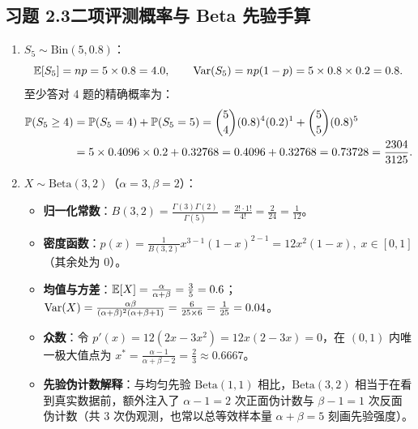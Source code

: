 \subsection*{习题 2.3\quad 二项评测概率与 Beta 先验手算}
\begin{enumerate}[label=(\arabic*), leftmargin=1.8em]
  \item $S_5 \sim \mathrm{Bin}(5, 0.8)$：
  \[
    \mathbb{E}[S_5] = np = 5 \times 0.8 = 4.0, \qquad
    \operatorname{Var}(S_5) = np(1-p) = 5 \times 0.8 \times 0.2 = 0.8.
  \]
  至少答对 4 题的精确概率为：
  \begin{align*}
    \mathbb{P}(S_5 \ge 4) &= \mathbb{P}(S_5 = 4) + \mathbb{P}(S_5 = 5)
    = \binom{5}{4}(0.8)^4(0.2)^1 + \binom{5}{5}(0.8)^5 \\
    &= 5 \times 0.4096 \times 0.2 + 0.32768 = 0.4096 + 0.32768 = 0.73728 = \frac{2304}{3125}.
  \end{align*}
  \item $X \sim \mathrm{Beta}(3, 2)$（$\alpha = 3, \beta = 2$）：
  \begin{itemize}
    \item \textbf{归一化常数}：$B(3, 2) = \frac{\Gamma(3)\Gamma(2)}{\Gamma(5)} = \frac{2!\cdot 1!}{4!} = \frac{2}{24} = \frac{1}{12}$。
    \item \textbf{密度函数}：$p(x) = \frac{1}{B(3,2)} x^{3-1}(1-x)^{2-1} = 12x^2(1 - x),\; x \in [0, 1]$（其余处为 $0$）。
    \item \textbf{均值与方差}：$\mathbb{E}[X] = \frac{\alpha}{\alpha+\beta} = \frac{3}{5} = 0.6$；$\operatorname{Var}(X) = \frac{\alpha\beta}{(\alpha+\beta)^2(\alpha+\beta+1)} = \frac{6}{25\times 6} = \frac{1}{25} = 0.04$。
    \item \textbf{众数}：令 $p'(x) = 12(2x - 3x^2) = 12x(2 - 3x) = 0$，在 $(0,1)$ 内唯一极大值点为 $x^* = \frac{\alpha-1}{\alpha+\beta-2} = \frac{2}{3} \approx 0.6667$。
    \item \textbf{先验伪计数解释}：与均匀先验 $\mathrm{Beta}(1, 1)$ 相比，$\mathrm{Beta}(3, 2)$ 相当于在看到真实数据前，额外注入了 $\alpha - 1 = 2$ 次正面伪计数与 $\beta - 1 = 1$ 次反面伪计数（共 $3$ 次伪观测，也常以总等效样本量 $\alpha+\beta=5$ 刻画先验强度）。
  \end{itemize}
\end{enumerate}

